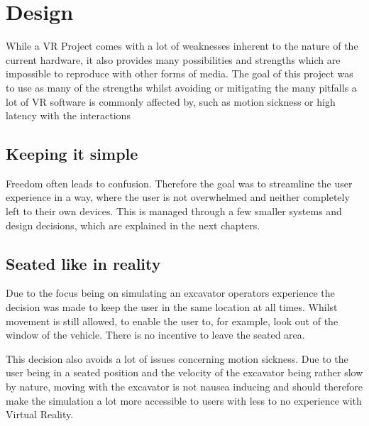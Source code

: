 \documentclass[journal]{vgtc}                     %
\begin{document}
\section{Design}

While a VR Project comes with a lot of weaknesses inherent to the nature of the current hardware, it also provides many possibilities and strengths which are impossible to reproduce with other forms of media.
The goal of this project was to use as many of the strengths whilst avoiding or mitigating the many pitfalls a lot of VR software is commonly affected by, such as motion sickness or high latency with the interactions


\subsection{Keeping it simple}

Freedom often leads to confusion. Therefore the goal was to streamline the user experience in a way, where the user is not overwhelmed and neither completely left to their own devices. This is managed through a few smaller systems and design decisions, which are explained in the next chapters.


\subsection{Seated like in reality}

Due to the focus being on simulating an excavator operators experience the decision was made to keep the user in the same location at all times. Whilst movement is still allowed, to enable the user to, for example, look out of the window of the vehicle. There is no incentive to leave the seated area.

This decision also avoids a lot of issues concerning motion sickness. Due to the user being in a seated position and the velocity of the excavator being rather slow by nature, moving with the excavator is not nausea inducing and should therefore make the simulation a lot more accessible to users with less to no experience with Virtual Reality.
\end{document}
